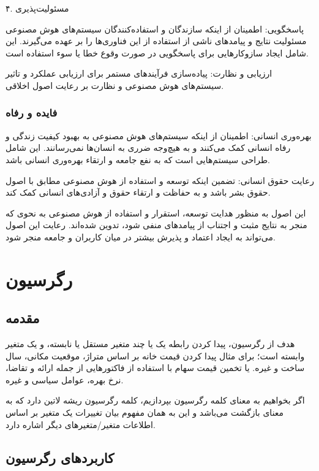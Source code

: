 \documentclass[a4paper, titlepage]{article}
\begin{document}
۴. مسئولیت‌پذیری

پاسخگویی: اطمینان از اینکه سازندگان و استفاده‌کنندگان سیستم‌های هوش مصنوعی مسئولیت نتایج و پیامدهای ناشی از استفاده از این فناوری‌ها را بر عهده می‌گیرند. این شامل ایجاد سازوکارهایی برای پاسخگویی در صورت وقوع خطا یا سوء استفاده است.

ارزیابی و نظارت: پیاده‌سازی فرآیندهای مستمر برای ارزیابی عملکرد و تاثیر سیستم‌های هوش مصنوعی و نظارت بر رعایت اصول اخلاقی.

\subsubsection{فایده و رفاه}

بهره‌وری انسانی: اطمینان از اینکه سیستم‌های هوش مصنوعی به بهبود کیفیت زندگی و رفاه انسانی کمک می‌کنند و به هیچ‌وجه ضرری به انسان‌ها نمی‌رسانند. این شامل طراحی سیستم‌هایی است که به نفع جامعه و ارتقاء بهره‌وری انسانی باشد.

رعایت حقوق انسانی: تضمین اینکه توسعه و استفاده از هوش مصنوعی مطابق با اصول حقوق بشر باشد و به حفاظت و ارتقاء حقوق و آزادی‌های انسانی کمک کند.

این اصول به منظور هدایت توسعه، استقرار و استفاده از هوش مصنوعی به نحوی که منجر به نتایج مثبت و اجتناب از پیامدهای منفی شود، تدوین شده‌اند. رعایت این اصول می‌تواند به ایجاد اعتماد و پذیرش بیشتر در میان کاربران و جامعه منجر شود.


\section{رگرسیون}
\subsection{مقدمه}
هدف از رگرسیون، پیدا کردن رابطه یک یا چند متغیر مستقل یا نابسته، و یک متغیر وابسته است؛ برای مثال پیدا کردن قیمت خانه بر اساس متراژ، موقعیت مکانی، سال ساخت و غیره. یا تخمین قیمت سهام با استفاده از فاکتور‌هایی از جمله ارائه و تقاضا، نرخ بهره، عوامل سیاسی و غیره.

اگر بخواهیم به معنای کلمه رگرسیون بپردازیم، کلمه رگرسیون ریشه لاتین دارد که به معنای بازگشت می‌باشد و این به همان مفهوم بیان تغییرات یک متغیر بر اساس اطلاعات متغیر/متغیر‌های دیگر اشاره دارد.

\subsection{کاربردهای رگرسیون}
\end{document}
